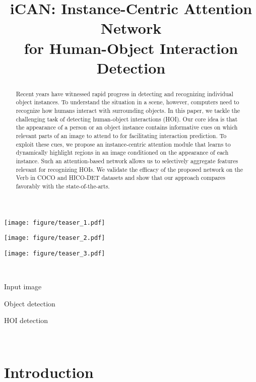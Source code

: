 \documentclass{bmvc2k}
\title{iCAN: Instance-Centric Attention Network\\ for Human-Object Interaction Detection}
\newlength\figmargin
\newcommand{\mpage}[2]
{
\begin{minipage}{#1\linewidth}\centering
#2
\end{minipage}
}
\begin{document}
\maketitle
\begin{center}
\centering
\mpage{0.31}{\texttt{[image: figure/teaser\_1.pdf]}}\hfill
\mpage{0.31}{\texttt{[image: figure/teaser\_2.pdf]}}\hfill
\mpage{0.31}{\texttt{[image: figure/teaser\_3.pdf]}} \\
\vspace{1mm}
\mpage{0.31}{Input image} \hfill
\mpage{0.31}{Object detection} \hfill
\mpage{0.31}{HOI detection} \\ \vspace{\figmargin}
\label{fig:teaser}
\end{center} 
\begin{abstract}
Recent years have witnessed rapid progress in detecting and recognizing individual object instances.
To understand the situation in a scene, however, computers need to recognize how humans interact with surrounding objects.
In this paper, we tackle the challenging task of detecting human-object interactions (HOI).
Our core idea is that the appearance of a person or an object instance contains informative cues on which relevant parts of an image to attend to for facilitating interaction prediction.
To exploit these cues, we propose an instance-centric attention module that learns to dynamically highlight regions in an image conditioned on the appearance of each instance.
Such an attention-based network allows us to selectively aggregate features relevant for recognizing HOIs.
We validate the efficacy of the proposed network on the Verb in COCO and HICO-DET datasets and show that our approach compares favorably with the state-of-the-arts.
\end{abstract}




%
 
\section{Introduction}
\label{sec:intro}
\end{document}
